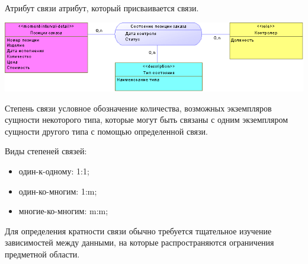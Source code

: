 \documentclass{beamer}
\begin{document}
\begin{frame}
\begin{block}{Атрибут связи}
атрибут, который присваивается связи.
\end{block}
\begin{center}
\includegraphics[scale=0.6]{images/rel-attribute.png}
\end{center}
\end{frame}

\begin{frame}
\begin{block}{Степень связи}
условное обозначение количества, возможных экземпляров сущности некоторого типа, которые могут быть связаны с одним экземпляром сущности другого типа с помощью определенной связи.
\end{block}
Виды степеней связей:
\begin{itemize}
\item один-к-одному: 1:1;
\item один-ко-многим: 1:m;
\item многие-ко-многим: m:m;
\end{itemize}
Для определения кратности связи обычно требуется тщательное изучение зависимостей между данными, на которые распространяются ограничения предметной области.
\end{frame}
\end{document}
